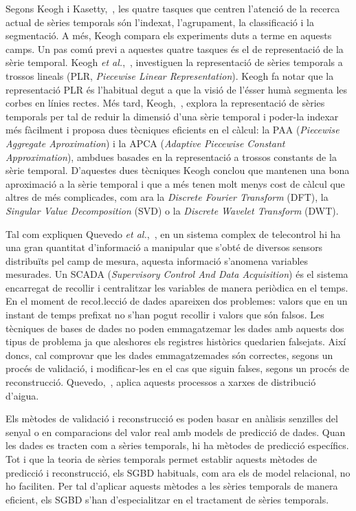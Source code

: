 Segons Keogh i Kasetty,~\cite{keogh02}, les quatre tasques que centren l'atenció de la recerca actual de sèries temporals són l'indexat, l'agrupament, la classificació i la segmentació. A més, Keogh compara els experiments duts a terme en aquests camps.
Un pas comú previ a aquestes quatre tasques és el de representació de la sèrie temporal. 
Keogh \emph{et al.},~\cite{keogh97,keogh98}, investiguen la representació de sèries temporals a trossos lineals (PLR, \emph{Piecewise Linear Representation}). Keogh fa notar que la representació PLR és l'habitual degut a que la visió de l'ésser humà segmenta les corbes en línies rectes.
Més tard, Keogh,~\cite{keogh00,keogh01}, explora la representació de sèries temporals per tal de reduir la dimensió d'una sèrie temporal i poder-la indexar més fàcilment  i proposa dues tècniques eficients en el càlcul: la PAA (\emph{Piecewise Aggregate Aproximation}) i  la APCA (\emph{Adaptive Piecewise Constant Approximation}), ambdues basades en la representació a trossos constants de la sèrie temporal. 
D'aquestes dues tècniques Keogh conclou que mantenen una bona aproximació a la sèrie temporal i que a més  tenen molt menys cost de càlcul que altres de més complicades, com ara la \emph{Discrete Fourier Transform} (DFT),  la  \emph{Singular Value Decomposition} (SVD) o la \emph{Discrete Wavelet Transform} (DWT).



Tal com expliquen Quevedo \emph{et al.},~\cite{quevedo10}, en un sistema complex de telecontrol hi ha una gran quantitat d'informació a manipular que s'obté de diversos sensors distribuïts pel camp de mesura, aquesta informació s'anomena variables mesurades. Un SCADA (\emph{Supervisory Control And Data Acquisition})  és el sistema encarregat de recollir i centralitzar les variables de manera periòdica en el temps. En el moment de reco\l.lecció de dades apareixen dos problemes: valors que en un instant de temps prefixat no s'han pogut recollir i valors que són falsos. Les tècniques de bases de dades no poden emmagatzemar les dades amb aquests dos tipus de problema ja que aleshores els registres històrics quedarien falsejats. Així doncs, cal comprovar que les dades emmagatzemades són correctes, segons un procés de validació, i modificar-les en el cas que siguin falses, segons un procés de reconstrucció. Quevedo,~\cite{quevedo10}, aplica aquests processos a xarxes de distribució d'aigua.

Els mètodes de validació i reconstrucció es poden basar en anàlisis senzilles del senyal o en comparacions del valor real amb models de predicció de dades. Quan les dades es tracten com a sèries temporals, hi ha mètodes de predicció específics.
Tot i que la teoria de sèries temporals permet establir aquests mètodes de predicció i reconstrucció, els SGBD habituals, com ara els de model relacional, no ho faciliten.  
Per tal d'aplicar aquests mètodes a les sèries temporals de manera eficient, els SGBD s'han d'especialitzar en el tractament de sèries temporals.



